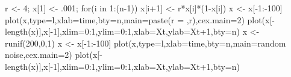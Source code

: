 \documentclass[
  a4paper,
  DIV=11,
  numbers=noendperiod,
  oneside]{scrreprt}
\newenvironment{Shaded}{\begin{snugshade}}{\end{snugshade}}
\newcommand{\AttributeTok}[1]{\textcolor[rgb]{0.40,0.45,0.13}{#1}}
\newcommand{\ControlFlowTok}[1]{\textcolor[rgb]{0.00,0.23,0.31}{#1}}
\newcommand{\DecValTok}[1]{\textcolor[rgb]{0.68,0.00,0.00}{#1}}
\newcommand{\FunctionTok}[1]{\textcolor[rgb]{0.28,0.35,0.67}{#1}}
\newcommand{\NormalTok}[1]{\textcolor[rgb]{0.00,0.23,0.31}{#1}}
\newcommand{\OtherTok}[1]{\textcolor[rgb]{0.00,0.23,0.31}{#1}}
\newcommand{\SpecialCharTok}[1]{\textcolor[rgb]{0.37,0.37,0.37}{#1}}
\newcommand{\StringTok}[1]{\textcolor[rgb]{0.13,0.47,0.30}{#1}}
\begin{document}
\begin{Shaded}
\begin{Highlighting}[]
\NormalTok{r }\OtherTok{\textless{}{-}} \DecValTok{4}\NormalTok{; x[}\DecValTok{1}\NormalTok{] }\OtherTok{\textless{}{-}}\NormalTok{ .}\DecValTok{001}\NormalTok{;}
\ControlFlowTok{for}\NormalTok{(i }\ControlFlowTok{in} \DecValTok{1}\SpecialCharTok{:}\NormalTok{(n}\DecValTok{{-}1}\NormalTok{)) x[i}\SpecialCharTok{+}\DecValTok{1}\NormalTok{] }\OtherTok{\textless{}{-}}\NormalTok{ r}\SpecialCharTok{*}\NormalTok{x[i]}\SpecialCharTok{*}\NormalTok{(}\DecValTok{1}\SpecialCharTok{{-}}\NormalTok{x[i])}
\NormalTok{x }\OtherTok{\textless{}{-}}\NormalTok{ x[}\SpecialCharTok{{-}}\DecValTok{1}\SpecialCharTok{:{-}}\DecValTok{100}\NormalTok{]}
\FunctionTok{plot}\NormalTok{(x,}\AttributeTok{type=}\StringTok{\textquotesingle{}l\textquotesingle{}}\NormalTok{,}\AttributeTok{xlab=}\StringTok{\textquotesingle{}time\textquotesingle{}}\NormalTok{,}\AttributeTok{bty=}\StringTok{\textquotesingle{}n\textquotesingle{}}\NormalTok{,}\AttributeTok{main=}\FunctionTok{paste}\NormalTok{(}\StringTok{\textquotesingle{}r = \textquotesingle{}}\NormalTok{,r),}\AttributeTok{cex.main=}\DecValTok{2}\NormalTok{) }
\FunctionTok{plot}\NormalTok{(x[}\SpecialCharTok{{-}}\FunctionTok{length}\NormalTok{(x)],x[}\SpecialCharTok{{-}}\DecValTok{1}\NormalTok{],}\AttributeTok{xlim=}\DecValTok{0}\SpecialCharTok{:}\DecValTok{1}\NormalTok{,}\AttributeTok{ylim=}\DecValTok{0}\SpecialCharTok{:}\DecValTok{1}\NormalTok{,}\AttributeTok{xlab=}\StringTok{\textquotesingle{}Xt\textquotesingle{}}\NormalTok{,}\AttributeTok{ylab=}\StringTok{\textquotesingle{}Xt+1\textquotesingle{}}\NormalTok{,}\AttributeTok{bty=}\StringTok{\textquotesingle{}n\textquotesingle{}}\NormalTok{)}
\NormalTok{x }\OtherTok{\textless{}{-}} \FunctionTok{runif}\NormalTok{(}\DecValTok{200}\NormalTok{,}\DecValTok{0}\NormalTok{,}\DecValTok{1}\NormalTok{)}
\NormalTok{x }\OtherTok{\textless{}{-}}\NormalTok{ x[}\SpecialCharTok{{-}}\DecValTok{1}\SpecialCharTok{:{-}}\DecValTok{100}\NormalTok{]}
\FunctionTok{plot}\NormalTok{(x,}\AttributeTok{type=}\StringTok{\textquotesingle{}l\textquotesingle{}}\NormalTok{,}\AttributeTok{xlab=}\StringTok{\textquotesingle{}time\textquotesingle{}}\NormalTok{,}\AttributeTok{bty=}\StringTok{\textquotesingle{}n\textquotesingle{}}\NormalTok{,}\AttributeTok{main=}\StringTok{\textquotesingle{}random noise\textquotesingle{}}\NormalTok{,}\AttributeTok{cex.main=}\DecValTok{2}\NormalTok{) }
\FunctionTok{plot}\NormalTok{(x[}\SpecialCharTok{{-}}\FunctionTok{length}\NormalTok{(x)],x[}\SpecialCharTok{{-}}\DecValTok{1}\NormalTok{],}\AttributeTok{xlim=}\DecValTok{0}\SpecialCharTok{:}\DecValTok{1}\NormalTok{,}\AttributeTok{ylim=}\DecValTok{0}\SpecialCharTok{:}\DecValTok{1}\NormalTok{,}\AttributeTok{xlab=}\StringTok{\textquotesingle{}Xt\textquotesingle{}}\NormalTok{,}\AttributeTok{ylab=}\StringTok{\textquotesingle{}Xt+1\textquotesingle{}}\NormalTok{,}\AttributeTok{bty=}\StringTok{\textquotesingle{}n\textquotesingle{}}\NormalTok{)}
\end{Highlighting}
\end{Shaded}
\end{document}
